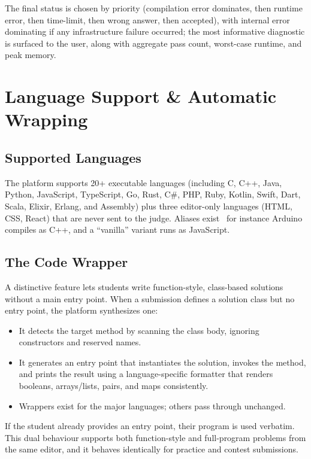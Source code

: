\documentclass[12pt,a4paper,oneside]{report}
\begin{document}
\noindent The final status is chosen by priority (compilation error dominates,
then runtime error, then time-limit, then wrong answer, then accepted), with
internal error dominating if any infrastructure failure occurred; the most
informative diagnostic is surfaced to the user, along with aggregate pass count,
worst-case runtime, and peak memory.

\chapter{Language Support \& Automatic Wrapping}
\section{Supported Languages}
The platform supports 20+ executable languages (including C, C++, Java, Python,
JavaScript, TypeScript, Go, Rust, C\#, PHP, Ruby, Kotlin, Swift, Dart, Scala,
Elixir, Erlang, and Assembly) plus three editor-only languages (HTML, CSS, React)
that are never sent to the judge. Aliases exist \textemdash\ for instance Arduino
compiles as C++, and a ``vanilla'' variant runs as JavaScript.

\section{The Code Wrapper}
A distinctive feature lets students write function-style, class-based solutions
without a main entry point. When a submission defines a solution class but no
entry point, the platform synthesizes one:
\begin{itemize}[leftmargin=1.5em]
  \item It detects the target method by scanning the class body, ignoring
        constructors and reserved names.
  \item It generates an entry point that instantiates the solution, invokes the
        method, and prints the result using a language-specific formatter that
        renders booleans, arrays/lists, pairs, and maps consistently.
  \item Wrappers exist for the major languages; others pass through unchanged.
\end{itemize}
If the student already provides an entry point, their program is used verbatim.
This dual behaviour supports both function-style and full-program problems from
the same editor, and it behaves identically for practice and contest submissions.
\end{document}
